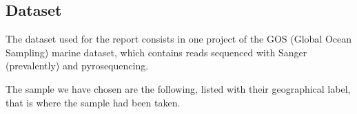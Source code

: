 
\subsection{Dataset}
The dataset used for the report consists in one project of the GOS (Global Ocean Sampling) marine dataset, which contains reads sequenced with Sanger (prevalently) and pyrosequencing.

The sample we have chosen are the following, listed with their geographical label, that is where the sample had been taken.

